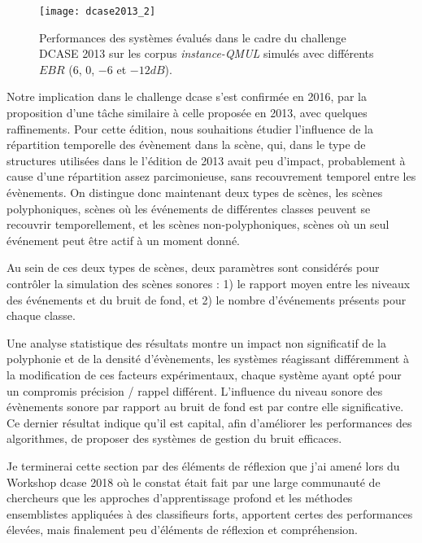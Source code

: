   \begin{figure}[t]
    \begin{center}
      \texttt{[image: dcase2013\_2]}
      \caption{Performances des systèmes évalués dans le cadre du challenge DCASE 2013 sur les corpus \emph{instance-QMUL} simulés avec différents $EBR$ ($6$, $0$, $-6$ et $-12dB$).}
      \label{fig:ebr}
    \end{center}
    \vspace{-4em}
  \end{figure}

  Notre implication dans le challenge dcase s'est confirmée en 2016\cite{mesa}, par la proposition d'une tâche similaire à celle proposée en 2013, avec quelques raffinements. Pour cette édition, nous souhaitions étudier l'influence de la répartition temporelle des évènement dans la scène, qui, dans le type de structures utilisées dans le l'édition de 2013 avait peu d'impact, probablement à cause d'une répartition assez parcimonieuse, sans recouvrement temporel entre les évènements. On distingue donc maintenant deux types de scènes, les scènes polyphoniques, scènes où les événements de différentes classes peuvent se recouvrir temporellement, et les scènes non-polyphoniques, scènes où un seul événement peut être actif à un moment donné.

  Au sein de ces deux types de scènes, deux paramètres sont considérés pour contrôler la simulation des scènes sonores : 1) le rapport moyen entre les niveaux des événements et du bruit de fond, et 2) le nombre d'événements présents pour chaque classe.

  Une analyse statistique des résultats\cite{lafayhal-01635414} montre un impact non significatif de la polyphonie et de la densité d'évènements, les systèmes réagissant différemment à la modification de ces facteurs expérimentaux, chaque système ayant opté pour un compromis précision / rappel différent. L'influence du niveau sonore des évènements sonore par rapport au bruit de fond est par contre elle significative. Ce dernier résultat indique qu'il est capital, afin d'améliorer les performances des algorithmes, de proposer des systèmes de gestion du bruit efficaces.

  Je terminerai cette section par des éléments de réflexion que j'ai amené lors du Workshop dcase 2018 où le constat était fait par une large communauté de chercheurs que les approches d'apprentissage profond et les méthodes ensemblistes appliquées à des classifieurs forts, apportent certes des performances élevées, mais finalement peu d'éléments de réflexion et compréhension.

